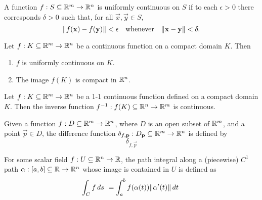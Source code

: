 \documentclass{article}
\begin{document}
\begin{theorem}
    A function ${f: S \subseteq \mathbb{R}^m \rightarrow \mathbb{R}^n}$ is uniformly continuous
    on $S$ if to each $\epsilon > 0$ there corresponds $\delta > 0$ such that, for all
    $\vec{x}, \vec{y} \in S$,
    \begin{equation*}
        \lVert f(\mathbf{x}) - f(\mathbf{y})\rVert < \epsilon \quad \textnormal{whenever} \quad \lVert\mathbf{x} - \mathbf{y}\rVert < \delta.
    \end{equation*}
\end{theorem}

\begin{theorem}
    Let $f: K \subseteq \mathbb{R}^m \rightarrow \mathbb{R}^n$ be a continuous function
    on a compact domain $K$. Then
    \begin{enumerate}
        \item $f$ is uniformly continuous on $K$.
        \item The image $f(K)$ is compact in $\mathbb{R}^n$.
    \end{enumerate}
\end{theorem}

\begin{theorem}
    Let $f: K \subseteq \mathbb{R}^m \rightarrow \mathbb{R}^n$ be a 1-1 continuous
    function defined on a compact domain $K$. Then the inverse function
    $f^{-1}: f(K) \subseteq \mathbb{R}^n \rightarrow \mathbb{R}^m$ is continuous.
\end{theorem}

\begin{definition}
    Given a function $f: D \subseteq \mathbb{R}^m \rightarrow \mathbb{R}^n$,
    where $D$ is an open subset of $\mathbb{R}^m$, and a point $\vec{p} \in D$,
    the difference function $\delta_{f, \mathbf{p}} : D_{\mathbf{p}} \subseteq \mathbb{R}^m \rightarrow \mathbb{R}^n$
    is defined by
    \begin{equation*}
        \delta_{f, \vec{p}}
    \end{equation*}
\end{definition}

\begin{definition}
    For some scalar field $f: U \subseteq \mathbb{R}^n \rightarrow \mathbb{R}$,
    the path integral along a (piecewise) $C^1$ path $\alpha: [a, b] \subseteq \mathbb{R} \rightarrow \mathbb{R}^n$
    whose image is contained in $U$ is defined as
    \begin{equation*}
        \int_{C} f \, ds\ =\int_{a}^{b} f(\alpha(t))\norm{\alpha'(t)} \, dt\
    \end{equation*}
\end{definition}
\end{document}
